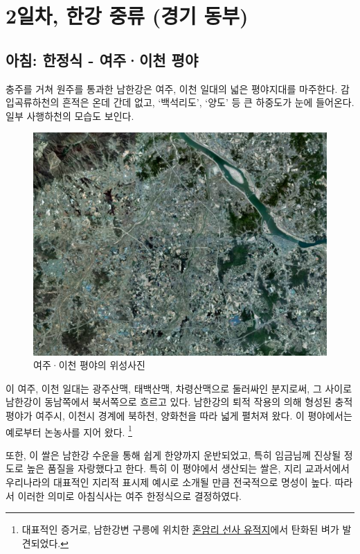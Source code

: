 \chapter{2일차, 한강 중류 (경기 동부)}
\section{아침: 한정식 - 여주·이천 평야}
충주를 거쳐 원주를 통과한 남한강은 여주, 이천 일대의 넓은 평야지대를 마주한다. 
감입곡류하천의 흔적은 온데 간데 없고, ‘백석리도’, ‘양도’ 등 큰 하중도가 눈에 들어온다.
일부 사행하천의 모습도 보인다.

\begin{figure}
    \centering
    \includegraphics[width=.6\textwidth]{img/여주이천평야.PNG}
    \caption{여주·이천 평야의 위성사진\protect\footnotemark}
    \label{fig:my_label}
\end{figure}


이 여주, 이천 일대는 
광주산맥, 태백산맥, 차령산맥으로 둘러싸인 분지로써,
그 사이로 남한강이 동남쪽에서 북서쪽으로 흐르고 있다.
남한강의 퇴적 작용의 의해 형성된 충적평야가 여주시, 이천시 경계에 북하천, 양화천을 따라 넓게 펼처져 왔다.
이 평야에서는 예로부터 논농사를 지어 왔다.
\footnote{대표적인 증거로, 남한강변 구릉에 위치한 \href{https://terms.naver.com/entry.naver?docId=1793906&cid=49217&categoryId=49217}{혼암리 선사 유적지}에서 탄화된 벼가 발견되었다.}


또한, 이 쌀은 남한강 수운을 통해 쉽게 한양까지 운반되었고, 특히 임금님께 진상될 정도로 높은 품질을 자랑했다고 한다.
특히 이 평야에서 생산되는 쌀은, 지리 교과서에서 우리나라의 대표적인 지리적 표시제 예시로 소개될 만큼 전국적으로 명성이 높다.
따라서 이러한 의미로 아침식사는 여주 한정식으로 결정하였다.
 

